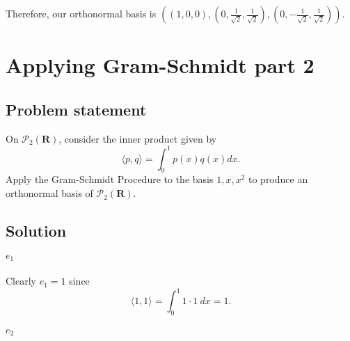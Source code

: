 \documentclass{article}
\begin{document}
Therefore, our orthonormal basis is $((1,0,0),(0,\frac{1}{\sqrt{2}},\frac{1}{\sqrt{2}}),(0,-\frac{1}{\sqrt{2}},\frac{1}{\sqrt{2}}))$.

\clearpage

\renewcommand{\thesection}{5}
\section{Applying Gram-Schmidt part 2}
\subsection*{Problem statement}
On $\mathcal{P}_2(\mathbf{R})$, consider the inner product given by
\[\langle p,q\rangle=\int_0^1 p(x)q(x)dx.\]
Apply the Gram-Schmidt Procedure to the basis $1,x,x^2$ to produce an orthonormal basis of $\mathcal{P}_2(\mathbf{R})$.

\subsection*{Solution}
\paragraph{$e_1$}
Clearly $e_1=1$ since 
\[\langle 1,1\rangle=\int_0^1 1\cdot 1\ dx=1.\]

\paragraph{$e_2$}
\end{document}
